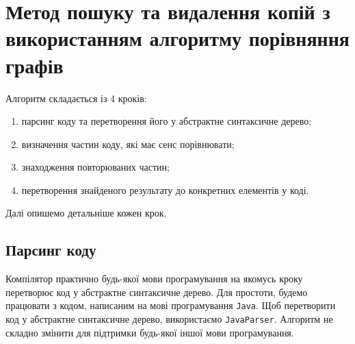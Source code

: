 \documentclass[a4paper, 14pt]{article}
\begin{document}
\section{Метод пошуку та видалення копій з використанням алгоритму порівняння графів}
Алгоритм складається із 4 кроків:
\begin{enumerate}
\item парсинг коду та перетворення його у абстрактне синтаксичне дерево;
\item визначення частин коду, які має сенс порівнювати;
\item знаходження повторюваних частин;
\item перетворення знайденого результату до конкретних елементів у коді.
\end{enumerate}
Далі опишемо детальніше кожен крок.
\subsection{Парсинг коду}
Компілятор практично будь-якої мови програмування на якомусь кроку перетворює код у абстрактне синтаксичне дерево. Для простоти, будемо працювати з кодом, написаним на мові програмування \verb|Java|. Щоб перетворити код у абстрактне синтаксичне дерево, використаємо \verb|JavaParser|. Алгоритм не складно змінити для підтримки будь-якої іншої мови програмування.
\end{document}
